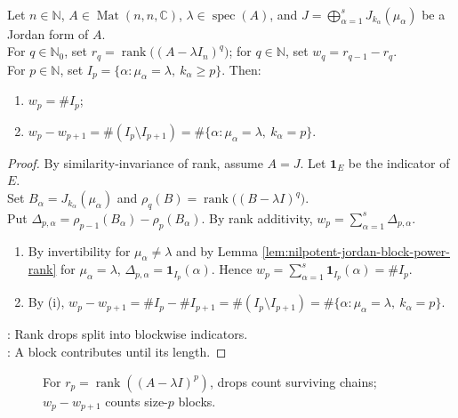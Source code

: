 \begin{theorem} \label{thm:jordan-block-sizes-from-rank-drops} \\
Let $n\in\mathbb{N}$, $A\in\operatorname{Mat}(n,n,\mathbb{C})$, $\lambda\in\operatorname{spec}(A)$, and $J=\bigoplus\limits_{\alpha=1}^sJ_{k_{\alpha}}(\mu_{\alpha})$ be a Jordan form of $A$.\\
For $q\in\mathbb{N}_0$, set $r_q=\operatorname{rank}\bigl((A-\lambda I_n)^q\bigr)$; for $q\in\mathbb{N}$, set $w_q=r_{q-1}-r_q$.\\
For $p\in\mathbb{N}$, set $I_p=\{\alpha:\mu_{\alpha}=\lambda,\ k_{\alpha}\geq p\}$. Then:
\begin{enumerate}[label=(\roman*)]
\setlength{\itemsep}{0pt}
\item $w_p=\# I_p$;
\item $w_p-w_{p+1}=\#(I_p\setminus I_{p+1})=\#\{\alpha:\mu_{\alpha}=\lambda,\ k_{\alpha}=p\}$.
\end{enumerate}
\begin{proof}
By similarity-invariance of rank, assume $A=J$. Let $\mathbf{1}_E$ be the indicator of $E$.\\
Set $B_{\alpha}=J_{k_{\alpha}}(\mu_{\alpha})$ and $\rho_q(B)=\operatorname{rank}\bigl((B-\lambda I)^q\bigr)$.\\
Put $\Delta_{p,\alpha}=\rho_{p-1}(B_{\alpha})-\rho_p(B_{\alpha})$. By rank additivity, $w_p=\sum\limits_{\alpha=1}^s\Delta_{p,\alpha}$.
\begin{enumerate}[label=(\roman*)]
\setlength{\itemsep}{0pt}
\item By invertibility for $\mu_{\alpha}\neq\lambda$ and by Lemma \ref{lem:nilpotent-jordan-block-power-rank} for $\mu_{\alpha}=\lambda$, $\Delta_{p,\alpha}=\mathbf{1}_{I_p}(\alpha)$. Hence $w_p=\sum\limits_{\alpha=1}^s\mathbf{1}_{I_p}(\alpha)=\#I_p$.
\item By (i), $w_p-w_{p+1}=\#I_p-\#I_{p+1}=\#(I_p\setminus I_{p+1})=\#\{\alpha:\mu_{\alpha}=\lambda,\ k_{\alpha}=p\}$.
\end{enumerate}
: Rank drops split into blockwise indicators.\\
: A block contributes until its length.
\end{proof}
\end{theorem}

\begin{figure}[H]
  \centering
  
  \caption{For $r_p=\operatorname{rank}((A-\lambda I)^p)$, drops count surviving chains; $w_p-w_{p+1}$ counts size-$p$ blocks.}
  \label{fig:weyr-rank-drops-jordan-blocks}
\end{figure}

